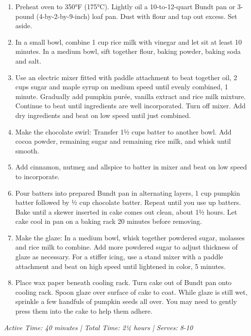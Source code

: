 \documentclass[12pt]{article}
\begin{document}
\begin{enumerate}
    \item Preheat oven to 350°F (175°C). Lightly oil a 10-to-12-quart Bundt pan or 3-pound (4-by-2-by-9-inch) loaf pan. Dust with flour and tap out excess. Set aside.
    
    \item In a small bowl, combine 1 cup rice milk with vinegar and let sit at least 10 minutes. In a medium bowl, sift together flour, baking powder, baking soda and salt.
    
    \item Use an electric mixer fitted with paddle attachment to beat together oil, 2 cups sugar and maple syrup on medium speed until evenly combined, 1 minute. Gradually add pumpkin purée, vanilla extract and rice milk mixture. Continue to beat until ingredients are well incorporated. Turn off mixer. Add dry ingredients and beat on low speed until just combined.
    
    \item Make the chocolate swirl: Transfer 1½ cups batter to another bowl. Add cocoa powder, remaining sugar and remaining rice milk, and whisk until smooth.
    
    \item Add cinnamon, nutmeg and allspice to batter in mixer and beat on low speed to incorporate.
    
    \item Pour batters into prepared Bundt pan in alternating layers, 1 cup pumpkin batter followed by ½ cup chocolate batter. Repeat until you use up batters. Bake until a skewer inserted in cake comes out clean, about 1½ hours. Let cake cool in pan on a baking rack 20 minutes before removing.
    
    \item Make the glaze: In a medium bowl, whisk together powdered sugar, molasses and rice milk to combine. Add more powdered sugar to adjust thickness of glaze as necessary. For a stiffer icing, use a stand mixer with a paddle attachment and beat on high speed until lightened in color, 5 minutes.
    
    \item Place wax paper beneath cooling rack. Turn cake out of Bundt pan onto cooling rack. Spoon glaze over surface of cake to coat. While glaze is still wet, sprinkle a few handfuls of pumpkin seeds all over. You may need to gently press them into the cake to help them adhere.
\end{enumerate}

\textit{Active Time: 40 minutes | Total Time: 2¼ hours | Serves: 8-10}
\end{document}
